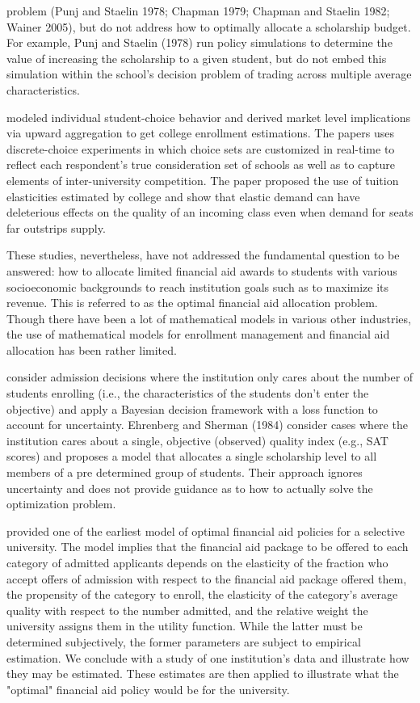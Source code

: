 \documentclass[12pt,english]{report}
\begin{document}
problem (Punj and Staelin 1978; Chapman 1979; Chapman and Staelin 1982; Wainer
2005), but do not address how  to optimally allocate a scholarship budget. For
example, Punj and Staelin (1978) run policy simulations to determine the value
of increasing the scholarship to a given student, but do not embed this
simulation within the school's decision problem of trading across multiple
average characteristics.

\citet{Carter2011} modeled individual student-choice behavior and derived
market level implications via upward aggregation to get college enrollment
estimations. The papers uses discrete-choice experiments in which choice sets
are customized in real-time to reflect each respondent's true consideration set
of schools as well as to capture elements of inter-university competition.  The
paper proposed the use of tuition elasticities estimated by college and show
that elastic demand can have deleterious effects on the quality of an incoming
class even when demand for seats far outstrips supply.

\vspace{0.25in}
These studies, nevertheless, have not addressed the fundamental question to be
answered: how to allocate limited financial aid awards to students with various
socioeconomic backgrounds to reach institution goals such as to maximize its
revenue. This is referred to as the optimal financial aid allocation problem.
Though there have been a lot of mathematical models in various other
industries, the use of mathematical models for enrollment management and
financial aid allocation has been rather limited.

\citet{Marsh2004} consider admission decisions where the institution only cares
about the number of students  enrolling (i.e., the characteristics of the
students don't enter the objective) and apply a Bayesian decision framework
with a loss function to account for uncertainty. Ehrenberg and Sherman (1984)
consider cases where the institution cares about a single, objective (observed)
quality index (e.g., SAT scores) and proposes a model that allocates a single
scholarship level to all members of a pre determined group of students. Their
approach ignores uncertainty and does not provide guidance as to how to
actually solve the optimization problem.

\citet{Ehrenberg1984} provided one of the earliest model of optimal financial
aid policies for a selective university. The model implies that the financial
aid package to be offered to each category of admitted applicants depends on
the elasticity of the fraction who accept offers of admission with respect to
the financial aid package offered them, the propensity of the category to
enroll, the elasticity of the category's average quality with respect to the
number admitted, and the relative weight the university assigns them in the
utility function. While the latter must be determined subjectively, the former
parameters are subject to empirical estimation. We conclude with a study of one
institution's data and illustrate how they may be estimated. These estimates
are then applied to illustrate what the "optimal" financial aid policy would be
for the university.
\end{document}
